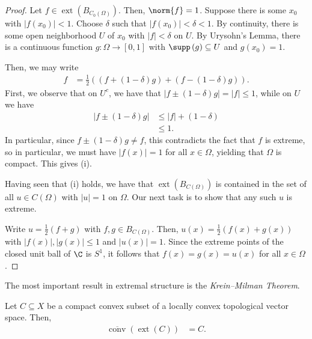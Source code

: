 \documentclass[10pt]{mypackage}
\begin{document}
\begin{proof}
  Let $f\in \operatorname{ext}\left( B_{C_0(\Omega)} \right)$. Then, $\norm{f} = 1$. Suppose there is some $x_0$ with $ \left\vert f\left( x_0 \right) \right\vert < 1 $. Choose $\delta$ such that $\left\vert f\left( x_0 \right) \right\vert < \delta < 1$. By continuity, there is some open neighborhood $U$ of $x_0$ with $\left\vert f \right\vert < \delta$ on $U$. By Urysohn's Lemma, there is a continuous function $g\colon \Omega\rightarrow [0,1]$ with $\supp\left( g \right)\subseteq U$ and $g\left( x_0 \right) = 1$.

  Then, we may write
  \begin{align*}
    f &= \frac{1}{2}\left( \left( f + \left( 1-\delta \right)g \right) + \left( f-\left( 1-\delta \right)g \right) \right).
  \end{align*}
  First, we observe that on $U^{c}$, we have that $\left\vert f \pm \left( 1-\delta \right)g \right\vert = \left\vert f \right\vert \leq 1$, while on $U$ we have
  \begin{align*}
    \left\vert f \pm \left( 1-\delta \right)g \right\vert &\leq \left\vert f \right\vert + \left( 1-\delta \right)\\
                                                          &\leq 1.
  \end{align*}
  In particular, since $f\pm \left( 1-\delta \right)g \neq f$, this contradicts the fact that $f$ is extreme, so in particular, we must have $\left\vert f(x) \right\vert = 1$ for all $x\in \Omega$, yielding that $\Omega$ is compact. This gives (i).

  Having seen that (i) holds, we have that $\operatorname{ext}\left( B_{C(\Omega)} \right)$ is contained in the set of all $u\in C(\Omega)$ with $\left\vert u \right\vert = 1$ on $\Omega$. Our next task is to show that any such $u$ is extreme.

  Write $u = \frac{1}{2}\left( f+g \right)$ with $f,g\in B_{C(\Omega)}$. Then, $u(x) = \frac{1}{2}\left( f(x) + g(x) \right)$ with $\left\vert f(x) \right\vert,\left\vert g(x) \right\vert\leq 1$ and $\left\vert u(x) \right\vert = 1$. Since the extreme points of the closed unit ball of $\C$ is $S^1$, it follows that $f(x) = g(x) = u(x)$ for all $x\in \Omega$.
\end{proof}
The most important result in extremal structure is the \textit{Krein--Milman Theorem}.
\begin{theorem}
  Let $C\subseteq X$ be a compact convex subset of a locally convex topological vector space. Then,
  \begin{align*}
    \overline{\operatorname{conv}}\left( \operatorname{ext}\left( C \right) \right) &= C.
  \end{align*}
\end{theorem}
\end{document}
